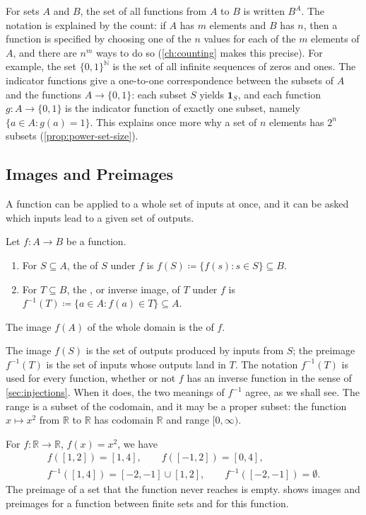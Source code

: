For sets $A$ and $B$, the set of all functions from $A$ to $B$ is written $B^A$. The notation is explained by the count: if $A$ has $m$ elements and $B$ has $n$, then a function is specified by choosing one of the $n$ values for each of the $m$ elements of $A$, and there are $n^m$ ways to do so (\cref{ch:counting} makes this precise). For example, the set $\{0,1\}^{\mathbb N}$ is the set of all infinite sequences of zeros and ones. The indicator functions give a one-to-one correspondence between the subsets of $A$ and the functions $A\to\{0,1\}$: each subset $S$ yields $\mathbf 1_S$, and each function $g\colon A\to\{0,1\}$ is the indicator function of exactly one subset, namely $\{a\in A: g(a)=1\}$. This explains once more why a set of $n$ elements has $2^n$ subsets (\cref{prop:power-set-size}).

\subsection{Images and Preimages}

A function can be applied to a whole set of inputs at once, and it can be asked which inputs lead to a given set of outputs.

\begin{definition}
\label{def:image}
Let $f\colon A\to B$ be a function.
\begin{enumerate}
\item For $S\subseteq A$, the  of $S$ under $f$ is $f(S)\coloneqq\{f(s): s\in S\}\subseteq B$.
\item For $T\subseteq B$, the , or inverse image, of $T$ under $f$ is $f^{-1}(T)\coloneqq\{a\in A: f(a)\in T\}\subseteq A$.
\end{enumerate}
The image $f(A)$ of the whole domain is the  of $f$.
\end{definition}

The image $f(S)$ is the set of outputs produced by inputs from $S$; the preimage $f^{-1}(T)$ is the set of inputs whose outputs land in $T$. The notation $f^{-1}(T)$ is used for every function, whether or not $f$ has an inverse function in the sense of \cref{sec:injections}. When it does, the two meanings of $f^{-1}$ agree, as we shall see. The range is a subset of the codomain, and it may be a proper subset: the function $x\mapsto x^2$ from $\mathbb R$ to $\mathbb R$ has codomain $\mathbb R$ and range $[0,\infty)$.

For $f\colon\mathbb R\to\mathbb R$, $f(x)=x^2$, we have
\begin{gather*}
f([1,2])=[1,4],\qquad f([-1,2])=[0,4],\\
f^{-1}([1,4])=[-2,-1]\cup[1,2],\qquad f^{-1}([-2,-1])=\emptyset .
\end{gather*}
The preimage of a set that the function never reaches is empty.  shows images and preimages for a function between finite sets and for this function.

